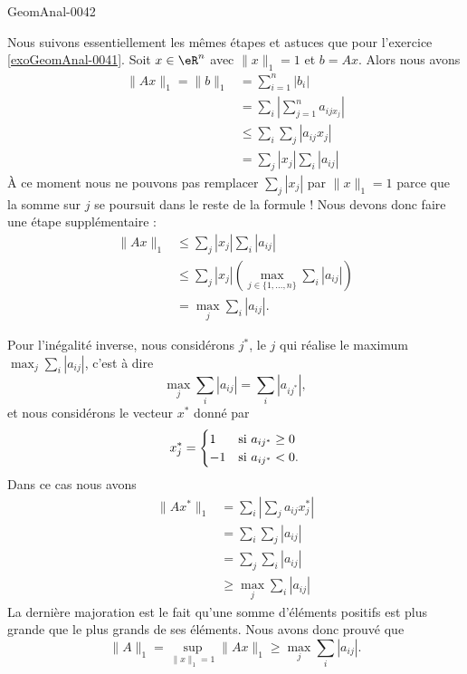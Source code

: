 \begin{corrige}{GeomAnal-0042}

    Nous suivons essentiellement les mêmes étapes et astuces que pour l'exercice \ref{exoGeomAnal-0041}. Soit \( x\in\eR^n\) avec \( \| x \|_1=1\) et \( b=Ax\). Alors nous avons
    \begin{subequations}
        \begin{align}
            \| Ax \|_1=\| b \|_1&=\sum_{i=1}^n| b_i |\\
            &=\sum_i\left| \sum_{j=1}^na_{ijx_j} \right| \\
            &\leq\sum_i\sum_j| a_{ij}x_j |\\
            &=\sum_j| x_j |\sum_i| a_{ij} |
        \end{align}
    \end{subequations}
    À ce moment nous ne pouvons pas remplacer \( \sum_j| x_j |\) par \( \| x \|_1=1\) parce que la somme sur \( j\) se poursuit dans le reste de la formule ! Nous devons donc faire une étape supplémentaire :
    \begin{subequations}
        \begin{align}
            \| Ax \|_1&\leq\sum_j| x_j |\sum_i| a_{ij} |\\
            &\leq\sum_j| x_j |\left( \max_{j\in\{ 1,\ldots,n \}}\sum_i| a_{ij} | \right)\\
            &=\max_j\sum_{i}| a_{ij} |.
        \end{align}
    \end{subequations}

    Pour l'inégalité inverse, nous considérons \( j^*\), le \( j\) qui réalise le maximum \( \max_j\sum_i| a_{ij} |\), c'est à dire
    \begin{equation}
        \max_j\sum_i| a_{ij} |=\sum_i| a_{ij^*} |,
    \end{equation}
    et nous considérons le vecteur \( x^*\) donné par
    \begin{equation}
        x^*_j=\begin{cases}
            1    &   \text{si \( a_{ij^*}\geq 0\)}\\
            -1    &    \text{si $a_{ij^*}<0$}.
        \end{cases}
    \end{equation}
    Dans ce cas nous avons
    \begin{subequations}
        \begin{align}
            \| Ax^* \|_1&=\sum_i\left| \sum_ja_{ij}x_j^* \right| \\
            &=\sum_i\sum_j| a_{ij} |\\
            &=\sum_{j}\sum_i| a_{ij} |\\
            &\geq\max_j\sum_i| a_{ij} |
        \end{align}
    \end{subequations}
    La dernière majoration est le fait qu'une somme d'éléments positifs est plus grande que le plus grands de ses éléments. Nous avons donc prouvé que
    \begin{equation}
        \| A \|_1=\sup_{\| x \|_1=1}\| Ax \|_1\geq\max_j\sum_i| a_{ij} |.
    \end{equation}

\end{corrige}
